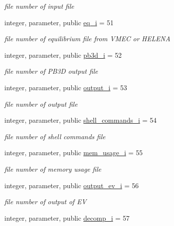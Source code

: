 \begin{DoxyCompactItemize}
\begin{DoxyCompactList}\small\item\em file number of input file \end{DoxyCompactList}\item 
integer, parameter, public \hyperlink{namespacenum__vars_a7b97a4fd25cbf874cbfe63417ba307ff}{eq\+\_\+i} = 51
\begin{DoxyCompactList}\small\item\em file number of equilibrium file from V\+M\+EC or H\+E\+L\+E\+NA \end{DoxyCompactList}\item 
integer, parameter, public \hyperlink{namespacenum__vars_aa59942bdbb47a383030d0bcc21e1a3c0}{pb3d\+\_\+i} = 52
\begin{DoxyCompactList}\small\item\em file number of P\+B3D output file \end{DoxyCompactList}\item 
integer, parameter, public \hyperlink{namespacenum__vars_aec5ffb30114a8af11226208844d12998}{output\+\_\+i} = 53
\begin{DoxyCompactList}\small\item\em file number of output file \end{DoxyCompactList}\item 
integer, parameter, public \hyperlink{namespacenum__vars_a2e139da75c6bcec4376b38d3ea1c5aa7}{shell\+\_\+commands\+\_\+i} = 54
\begin{DoxyCompactList}\small\item\em file number of shell commands file \end{DoxyCompactList}\item 
integer, parameter, public \hyperlink{namespacenum__vars_a606c68d407ec135c105f0501c224ea1b}{mem\+\_\+usage\+\_\+i} = 55
\begin{DoxyCompactList}\small\item\em file number of memory usage file \end{DoxyCompactList}\item 
integer, parameter, public \hyperlink{namespacenum__vars_a98774008e1bfbed335a89f813c7dcbde}{output\+\_\+ev\+\_\+i} = 56
\begin{DoxyCompactList}\small\item\em file number of output of EV \end{DoxyCompactList}\item 
integer, parameter, public \hyperlink{namespacenum__vars_a886394fc855acaa9a5e4ab5b3ce8c9d9}{decomp\+\_\+i} = 57

\end{DoxyCompactItemize}
